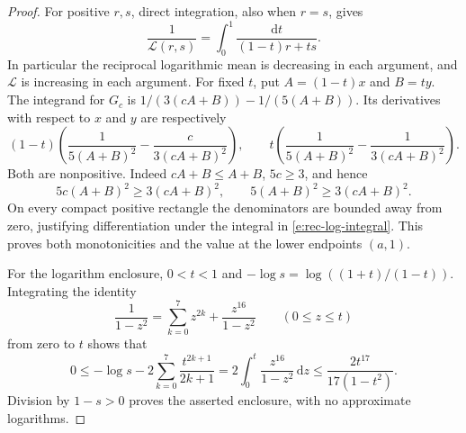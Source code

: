\begin{proof}
For positive \(r,s\), direct integration, also when \(r=s\), gives
\begin{equation}\label{e:rec-log-integral}
 \frac1{\mathcal L(r,s)}
       =\int_0^1\frac{\mathrm dt}{(1-t)r+ts}.
\end{equation}
In particular the reciprocal logarithmic mean is decreasing in each
argument, and \(\mathcal L\) is increasing in each argument.
For fixed \(t\), put \(A=(1-t)x\) and \(B=ty\).
The integrand for \(G_c\) is
\(1/(3(cA+B))-1/(5(A+B))\).  Its derivatives with respect to
\(x\) and \(y\) are respectively
\[
 (1-t)\left(\frac1{5(A+B)^2}
                   -\frac{c}{3(cA+B)^2}\right),\qquad
 t\left(\frac1{5(A+B)^2}
                   -\frac1{3(cA+B)^2}\right).
\]
Both are nonpositive.  Indeed \(cA+B\le A+B\), \(5c\ge3\),
and hence
\[
 5c(A+B)^2\ge3(cA+B)^2,\qquad
 5(A+B)^2\ge3(cA+B)^2.
\]
On every compact positive rectangle the denominators are bounded
away from zero, justifying differentiation under the integral in
\eqref{e:rec-log-integral}.  This proves both monotonicities and
the value at the lower endpoints \((a,1)\).

For the logarithm enclosure, \(0<t<1\) and
\(-\log s=\log((1+t)/(1-t))\).  Integrating the identity
\[
 \frac1{1-z^2}=\sum_{k=0}^7z^{2k}+\frac{z^{16}}{1-z^2}
       \qquad(0\le z\le t)
\]
from zero to \(t\) shows that
\[
 0\le-\log s-2\sum_{k=0}^7\frac{t^{2k+1}}{2k+1}
   =2\int_0^t\frac{z^{16}}{1-z^2}\,\mathrm dz
   \le\frac{2t^{17}}{17(1-t^2)}.
\]
Division by \(1-s>0\) proves the asserted enclosure, with no
approximate logarithms.


\end{proof}

